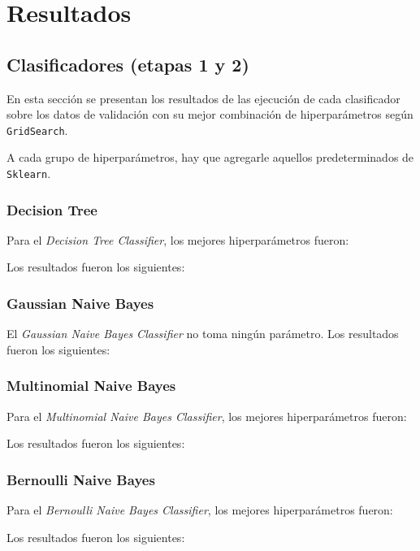 \section{Resultados}

\subsection{Clasificadores (etapas 1 y 2)}

En esta sección se presentan los resultados de las ejecuci\'on de cada clasificador sobre los datos de validaci\'on con su mejor combinación de hiperparámetros según \texttt{GridSearch}.

A cada grupo de hiperpar\'ametros, hay que agregarle aquellos predeterminados de \texttt{Sklearn}.

\subsubsection{Decision Tree}
Para el \emph{Decision Tree Classifier}, los mejores hiperpar\'ametros fueron:
\begin{itemize}
\end{itemize}
Los resultados fueron los siguientes:

\subsubsection{Gaussian Naive Bayes}
El \emph{Gaussian Naive Bayes Classifier} no toma ning\'un par\'ametro.
Los resultados fueron los siguientes:

\subsubsection{Multinomial Naive Bayes}
Para el \emph{Multinomial Naive Bayes Classifier}, los mejores hiperpar\'ametros fueron:
\begin{itemize}
\end{itemize}
Los resultados fueron los siguientes:

\subsubsection{Bernoulli Naive Bayes}
Para el \emph{Bernoulli Naive Bayes Classifier}, los mejores hiperpar\'ametros fueron:
\begin{itemize}
\end{itemize}
Los resultados fueron los siguientes:


